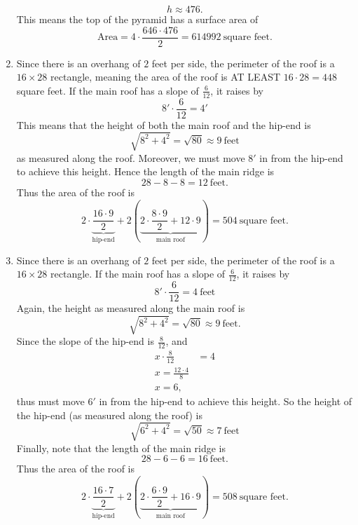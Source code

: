 \documentclass[hints,nooutcomes,noauthor,handout]{ximera}
\begin{document}
\begin{question}
\begin{freeResponse}
\begin{enumerate}
\[      h \approx 476.
      \]
      This means the top of the pyramid has a surface area of
      \[
      \text{Area} = 4\cdot \frac{646\cdot 476}{2} = 614992~\text{square feet}.
      \]
    \item Since there is an overhang of $2$ feet per side, the
      perimeter of the roof is a $16\times 28$ rectangle, meaning the
      area of the roof is AT LEAST $16\cdot 28 = 448$ square feet. If
      the main roof has a slope of $\frac{6}{12}$, it raises by
      \[
      8'\cdot \frac{6}{12}  = 4'
      \]
      This means that the height of both the main roof and the hip-end is
      \[
      \sqrt{8^2+4^2} = \sqrt{80} \approx 9~\text{feet}
      \]
      as measured along the roof. Moreover, we must move $8'$ in from
      the hip-end to achieve this height. Hence the length of the main
      ridge is
      \[
      28-8-8 = 12~\text{feet}.
      \]
      Thus the area of the roof is
      \[
      2\cdot \underbrace{\frac{16\cdot 9}{2}}_{\text{hip-end}} +
      2\left(\underbrace{2\cdot \frac{8\cdot 9}{2} + 12\cdot
        9}_{\text{main roof}}\right) = 504~\text{square feet}.
      \]
    \item Since there is an overhang of $2$ feet per side, the
      perimeter of the roof is a $16\times 28$ rectangle. If the main
      roof has a slope of $\frac{6}{12}$, it raises by
      \[
      8'\cdot \frac{6}{12}  = 4~\text{feet}
      \]
      Again, the height as measured along the main roof is
      \[
      \sqrt{8^2+4^2} = \sqrt{80}\approx 9~\text{feet}.
      \]
      Since the slope of the hip-end is $\frac{8}{12}$, and
      \begin{align*}
        x\cdot \frac{8}{12} &= 4\\
        x = \frac{12\cdot 4}{8}\\
        x = 6,
      \end{align*}
      thus must move $6'$ in from the hip-end to achieve this height.
      So the height of the hip-end (as measured along the roof) is
      \[
      \sqrt{6^2+4^2} = \sqrt{50} \approx 7~\text{feet}
      \]
      Finally, note that the length of the main ridge is
      \[
      28-6-6 = 16~\text{feet}.
      \]
      Thus the area of the roof is
      \[
      2\cdot \underbrace{\frac{16\cdot 7}{2}}_{\text{hip-end}} +
      2\left(\underbrace{2\cdot \frac{6\cdot 9}{2} + 16\cdot
        9}_{\text{main roof}}\right) = 508~\text{square feet}.
      \]
  \end{enumerate}
\end{freeResponse}


\end{question}
\mynewpage
\end{document}
